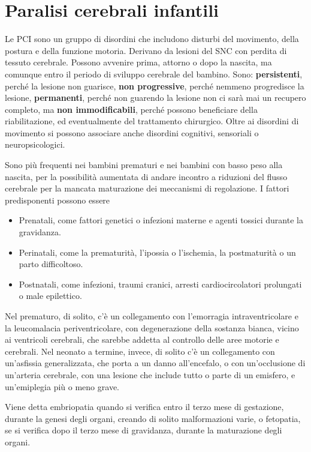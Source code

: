 \chapter{Paralisi cerebrali infantili}
Le PCI sono un gruppo di disordini che includono disturbi del movimento, della postura e della funzione motoria.
Derivano da lesioni del SNC con perdita di tessuto cerebrale. Possono avvenire prima, attorno o dopo la nascita, ma comunque entro il
periodo di sviluppo cerebrale del bambino. 
Sono: \textbf{persistenti}, perché la lesione non guarisce, \textbf{non progressive}, perché nemmeno progredisce la lesione,
\textbf{permanenti}, perché non guarendo la lesione non ci sarà mai un recupero completo, ma \textbf{non immodificabili}, perché possono
beneficiare della riabilitazione, ed eventualmente del trattamento chirurgico.
Oltre ai disordini di movimento si possono associare anche disordini cognitivi, sensoriali o neuropsicologici.

Sono più frequenti nei bambini prematuri e nei bambini con basso peso alla nascita, per la possibilità aumentata di andare incontro a
riduzioni del flusso cerebrale per la mancata maturazione dei meccanismi di regolazione.
I fattori predisponenti possono essere
\begin{itemize}
\item Prenatali, come fattori genetici o infezioni materne e agenti tossici durante la gravidanza.
\item Perinatali, come la prematurità, l'ipossia o l'ischemia, la postmaturità o un parto difficoltoso.
\item Postnatali, come infezioni, traumi cranici, arresti cardiocircolatori prolungati o male epilettico.
\end{itemize}

Nel prematuro, di solito, c'è un collegamento con l'emorragia intraventricolare e la leucomalacia periventricolare, con degenerazione
della sostanza bianca, vicino ai ventricoli cerebrali, che sarebbe addetta al controllo delle aree motorie e cerebrali.
Nel neonato a termine, invece, di solito c'è un collegamento con un'asfissia generalizzata, che porta a un danno all'encefalo, o con
un'occlusione di un'arteria cerebrale, con una lesione che include tutto o parte di un emisfero, e un'emiplegia più o meno grave.

Viene detta embriopatia quando si verifica entro il terzo mese di gestazione, durante la genesi degli organi, creando di solito
malformazioni varie, o fetopatia, se si verifica dopo il terzo mese di gravidanza, durante la maturazione degli organi.

